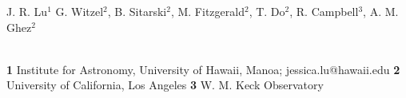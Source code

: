 J. R. Lu${}^1$
G. Witzel${}^2$,
B. Sitarski${}^2$,
M. Fitzgerald${}^2$,
T. Do${}^2$,
R. Campbell${}^3$,
A. M. Ghez${}^2$

\\
{\bf 1} Institute for Astronomy, University of Hawaii, Manoa;
jessica.lu@hawaii.edu
{\bf 2} University of California, Los Angeles
{\bf 3} W. M. Keck Observatory
